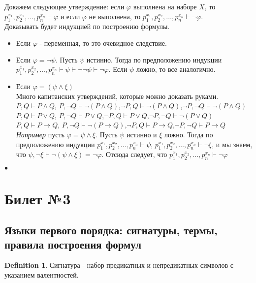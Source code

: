 \documentclass[a4paper]{article}
\theoremstyle{plain}
\theoremstyle{remark}
\theoremstyle{definition}
\newtheorem{definition}{Definition}
\renewenvironment{proof}{{\bfseries Proof}}{$\bullet$}
\begin{document}
\begin{proof}
	\forcenewline
	Докажем следующее утверждение: если $\varphi$ выполнена на наборе $X$, то $p_1^{x_1}, p_2^{x_2}, \ldots, p_n^{x_n} \vdash \varphi$ и если $\varphi$ не выполнена, то $p_1^{x_1}, p_2^{x_2}, \ldots, p_n^{x_n} \vdash \lnot \varphi$. \\
	Доказывать будет индукцией по построению формулы. 
\begin{itemize}
\item Если $\varphi$ - переменная, то это очевидное следствие.
\item Если $\varphi = \lnot \psi$. Пусть $\psi$ истинно. Тогда по предположению индукции $p_1^{x_1}, p_2^{x_2}, \ldots, p_n^{x_n} \vdash \psi \vdash \lnot \lnot \psi \vdash \lnot \varphi$. Если $\psi$ ложно, то все аналогично.	
\item Если $\varphi = (\psi \land \xi)$ \\
	Много капитанских утверждений, которые можно доказать руками.
	$P,Q \vdash P \land Q$, $P,\lnot Q \vdash \lnot(P \land Q)$,$\lnot P,Q \vdash \lnot(P \land Q)$,$\lnot P,\lnot Q \vdash \lnot(P \land Q)$ \\
	$P,Q \vdash P \lor Q$, $P,\lnot Q \vdash P \lor Q$,$\lnot P,Q \vdash P \lor Q$,$\lnot P,\lnot Q \vdash \lnot(P \lor Q)$ \\
	$P,Q \vdash P \rightarrow Q$, $P,\lnot Q \vdash \lnot(P \rightarrow Q)$,$\lnot P,Q \vdash P \rightarrow Q$,$\lnot P,\lnot Q \vdash P \rightarrow Q$ \\
	\emph{Например} пусть $\varphi = \psi \land \xi$. Пусть $\psi$ истинно и $\xi$ ложно. Тогда по предположению индукции $p_1^{x_1}, p_2^{x_2}, \ldots, p_n^{x_n} \vdash \psi$, $p_1^{x_1}, p_2^{x_2}, \ldots, p_n^{x_n} \vdash \lnot \xi$, и мы знаем, что $\psi,\lnot \xi \vdash \lnot(\psi \land \xi) = \lnot \varphi$. Отсюда следует, что $p_1^{x_1}, p_2^{x_2}, \ldots, p_n^{x_n} \vdash \lnot \varphi$
\end{itemize}
\end{proof}
\section{Билет №3}
\subsection{Языки первого порядка: сигнатуры, термы, правила построения формул}
\begin{definition}
	Сигнатура - набор предикатных и непредикатных символов с указанием валентностей. 
\end{definition}
\end{document}
